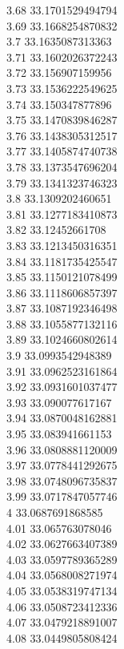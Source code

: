 {3.68	33.1701529494794\\
3.69	33.1668254870832\\
3.7	33.1635087313363\\
3.71	33.1602026372243\\
3.72	33.156907159956\\
3.73	33.1536222549625\\
3.74	33.150347877896\\
3.75	33.1470839846287\\
3.76	33.1438305312517\\
3.77	33.1405874740738\\
3.78	33.1373547696204\\
3.79	33.1341323746323\\
3.8	33.1309202460651\\
3.81	33.1277183410873\\
3.82	33.12452661708\\
3.83	33.1213450316351\\
3.84	33.1181735425547\\
3.85	33.1150121078499\\
3.86	33.1118606857397\\
3.87	33.1087192346498\\
3.88	33.1055877132116\\
3.89	33.1024660802614\\
3.9	33.0993542948389\\
3.91	33.0962523161864\\
3.92	33.0931601037477\\
3.93	33.090077617167\\
3.94	33.0870048162881\\
3.95	33.083941661153\\
3.96	33.0808881120009\\
3.97	33.0778441292675\\
3.98	33.0748096735837\\
3.99	33.0717847057746\\
4	33.0687691868585\\
4.01	33.065763078046\\
4.02	33.0627663407389\\
4.03	33.0597789365289\\
4.04	33.0568008271974\\
4.05	33.0538319747134\\
4.06	33.0508723412336\\
4.07	33.0479218891007\\
4.08	33.0449805808424\\
}
